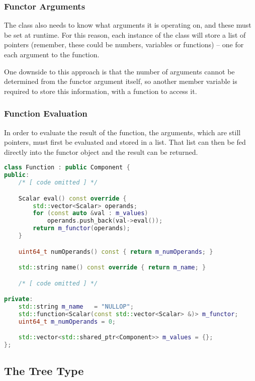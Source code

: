 \documentclass[12pt]{article}
\begin{document}
\subsubsection{Functor Arguments}

The  class also needs to know what arguments it is operating on, and these must be set at runtime. For this reason, each instance of the class will store a list of  pointers (remember, these could be numbers, variables or functions) -- one for each argument to the function.

One downside to this approach is that the number of arguments cannot be determined from the functor argument itself, so another member variable is required to store this information, with a function to access it.

\subsubsection{Function Evaluation}

In order to evaluate the result of the function, the arguments, which are still  pointers, must first be evaluated and stored in a list. That list can then be fed directly into the functor object and the result can be returned.

\vspace{1cm}

\begin{lstlisting}[language=C++]
class Function : public Component {
public:
	/* [ code omitted ] */

	Scalar eval() const override {
		std::vector<Scalar> operands;
		for (const auto &val : m_values)
			operands.push_back(val->eval());
		return m_functor(operands);
	}

	uint64_t numOperands() const { return m_numOperands; }

	std::string name() const override { return m_name; }

	/* [ code omitted ] */

private:
	std::string m_name	 = "NULLOP";
	std::function<Scalar(const std::vector<Scalar> &)> m_functor;
	uint64_t m_numOperands = 0;

	std::vector<std::shared_ptr<Component>> m_values = {};
};
\end{lstlisting}

\subsection{The Tree Type}
\end{document}
